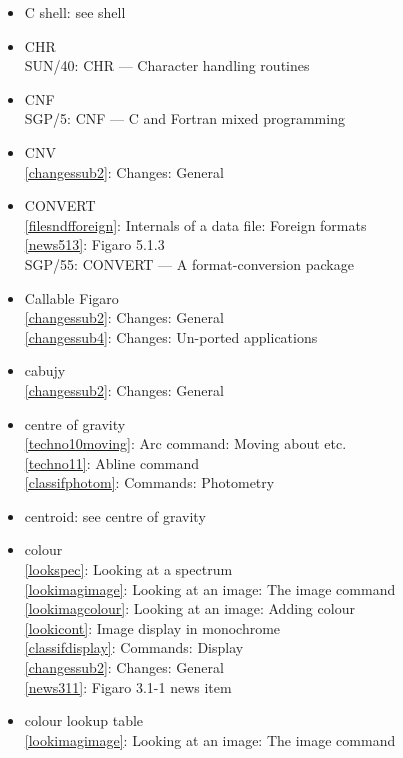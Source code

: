 \documentclass[11pt,twoside]{article}
\newcommand{\htmlref}[2]{#1}
\newcommand{\xref}[3]{#1}
\newcommand{\idxint}[2]{\ref{#1}: \htmlref{#2}{#1}}
\newcommand{\idxint}[2]{\htmlref{#2}{#1}}
\newcommand{\latorhtm}[2]{#1}
\newcommand{\latorhtm}[2]{#2}
\begin{document}
\begin{itemize}
\item C shell: see shell
\item CHR\\
   \xref{SUN/40: CHR \latorhtm{---}{-} Character handling routines}{sun40}{}
\item CNF\\
   \xref{SGP/5: CNF \latorhtm{---}{-} C and Fortran mixed programming}{sgp5}{}
\item CNV\\
   \idxint{changessub2}{Changes: General}
\item CONVERT\\
   \idxint{filesndfforeign}{Internals of a data file: Foreign formats}\\
   \idxint{news513}{Figaro 5.1.3}\\
   \xref{SGP/55: CONVERT \latorhtm{---}{-} A format-conversion package}{sun55}{}
\item Callable Figaro\\
   \idxint{changessub2}{Changes: General}\\
   \idxint{changessub4}{Changes: Un-ported applications}
\item cabujy\\
   \idxint{changessub2}{Changes: General}
\item centre of gravity\\
   \idxint{techno10moving}{Arc command: Moving about etc.}\\
   \idxint{techno11}{Abline command}\\
   \idxint{classifphotom}{Commands: Photometry}
\item centroid: see centre of gravity
\item colour\\
   \idxint{lookspec}{Looking at a spectrum}\\
   \idxint{lookimagimage}{Looking at an image: The image command}\\
   \idxint{lookimagcolour}{Looking at an image: Adding colour}\\
   \idxint{lookicont}{Image display in monochrome}\\
   \idxint{classifdisplay}{Commands: Display}\\
   \idxint{changessub2}{Changes: General}\\
   \idxint{news311}{Figaro 3.1-1 news item}
\item colour lookup table\\
   \idxint{lookimagimage}{Looking at an image: The image command}\\

\end{itemize}
\end{document}
